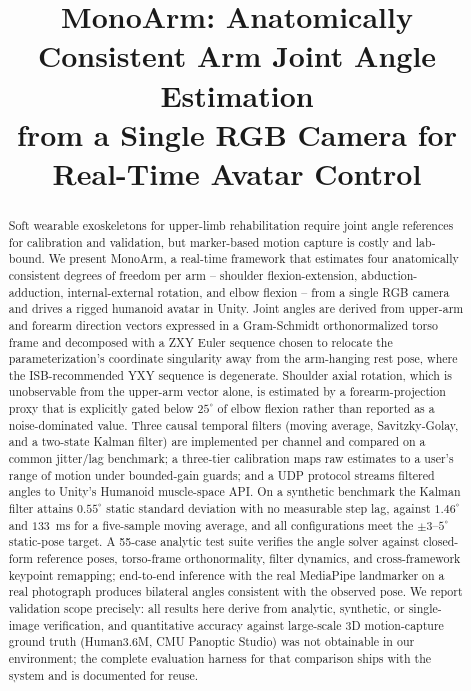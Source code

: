 \documentclass[conference]{IEEEtran}
\begin{document}
\title{MonoArm: Anatomically Consistent Arm Joint Angle Estimation\\
from a Single RGB Camera for Real-Time Avatar Control}

\author{
}

\maketitle

\begin{abstract}
Soft wearable exoskeletons for upper-limb rehabilitation require joint
angle references for calibration and validation, but marker-based motion
capture is costly and lab-bound. We present MonoArm, a real-time
framework that estimates four anatomically consistent degrees of freedom
per arm -- shoulder flexion-extension, abduction-adduction,
internal-external rotation, and elbow flexion -- from a single RGB camera
and drives a rigged humanoid avatar in Unity. Joint angles are derived
from upper-arm and forearm direction vectors expressed in a Gram-Schmidt
orthonormalized torso frame and decomposed with a ZXY Euler sequence
chosen to relocate the parameterization's coordinate singularity away
from the arm-hanging rest pose, where the ISB-recommended YXY sequence is
degenerate. Shoulder axial rotation, which is unobservable from the
upper-arm vector alone, is estimated by a forearm-projection proxy that
is explicitly gated below $25^\circ$ of elbow flexion rather than
reported as a noise-dominated value. Three causal temporal filters
(moving average, Savitzky-Golay, and a two-state Kalman filter) are
implemented per channel and compared on a common jitter/lag benchmark; a
three-tier calibration maps raw estimates to a user's range of motion
under bounded-gain guards; and a UDP protocol streams filtered angles to
Unity's Humanoid muscle-space API. On a synthetic benchmark the Kalman
filter attains $0.55^\circ$ static standard deviation with no measurable
step lag, against $1.46^\circ$ and $133$~ms for a five-sample moving
average, and all configurations meet the $\pm3$--$5^\circ$ static-pose
target. A 55-case analytic test suite verifies the angle solver against
closed-form reference poses, torso-frame orthonormality, filter dynamics,
and cross-framework keypoint remapping; end-to-end inference with the
real MediaPipe landmarker on a real photograph produces bilateral angles
consistent with the observed pose. We report validation scope precisely:
all results here derive from analytic, synthetic, or single-image
verification, and quantitative accuracy against large-scale 3D
motion-capture ground truth (Human3.6M, CMU Panoptic Studio) was not
obtainable in our environment; the complete evaluation harness for that
comparison ships with the system and is documented for reuse.
\end{abstract}
\end{document}
